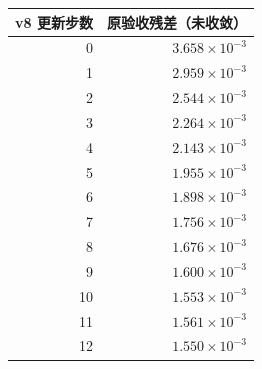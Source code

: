 \begin{tabular}{rr}
\toprule
v8 更新步数 & 原验收残差（未收敛） \\
\midrule
0 & $3.658\times10^{-3}$ \\
1 & $2.959\times10^{-3}$ \\
2 & $2.544\times10^{-3}$ \\
3 & $2.264\times10^{-3}$ \\
4 & $2.143\times10^{-3}$ \\
5 & $1.955\times10^{-3}$ \\
6 & $1.898\times10^{-3}$ \\
7 & $1.756\times10^{-3}$ \\
8 & $1.676\times10^{-3}$ \\
9 & $1.600\times10^{-3}$ \\
10 & $1.553\times10^{-3}$ \\
11 & $1.561\times10^{-3}$ \\
12 & $1.550\times10^{-3}$ \\
\bottomrule
\end{tabular}
